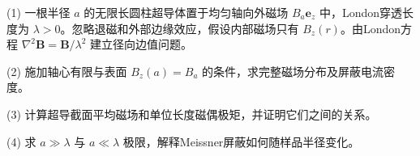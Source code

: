 (1) 一根半径 \(a\) 的无限长圆柱超导体置于均匀轴向外磁场 \(B_a\mathbf e_z\) 中，London穿透长度为 \(\lambda>0\)。忽略退磁和外部边缘效应，假设内部磁场只有 \(B_z(r)\)。由London方程 \(\nabla^2\mathbf B=\mathbf B/\lambda^2\) 建立径向边值问题。

(2) 施加轴心有限与表面 \(B_z(a)=B_a\) 的条件，求完整磁场分布及屏蔽电流密度。

(3) 计算超导截面平均磁场和单位长度磁偶极矩，并证明它们之间的关系。

(4) 求 \(a\gg\lambda\) 与 \(a\ll\lambda\) 极限，解释Meissner屏蔽如何随样品半径变化。
